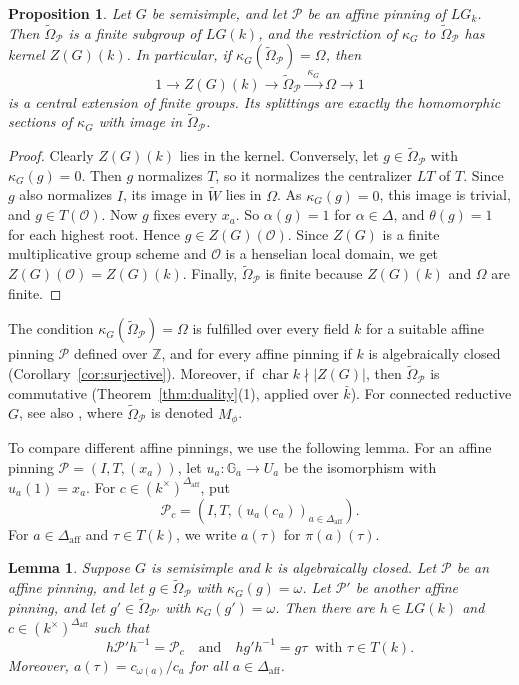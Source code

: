 \documentclass[psamsfonts]{amsart}
\newtheorem{prop}[thm]{Proposition}
\newtheorem{lem}[thm]{Lemma}
\theoremstyle{definition}
\theoremstyle{remark}
\numberwithin{equation}{section}
\newcommand{\Z}{\mathbb{Z}}   %
\newcommand{\extw}{\widetilde{W}}
\newcommand{\ra}{\rightarrow}
\newcommand{\xra}{\xrightarrow}
\newcommand{\tOm}{\widetilde{\Omega}}
\DeclareMathOperator{\aff}{aff}
\DeclareMathOperator{\chara}{char}
\newcommand\cO{\mathcal{O}}
\newcommand\cP{\mathcal{P}}
\newcommand\Ga{\mathbb{G}_a}
\numberwithin{equation}{section}
\newcommand{\om}{\omega}
\newcommand{\Om}{\Omega}
\newcommand{\Daff}{\Delta_{\aff}}
\theoremstyle{plain}
\begin{document}
\begin{prop}\label{prop:Z-extension}
Let $G$ be semisimple, and let $\cP$ be an affine pinning of $LG_k$. Then $\tOm_\cP$ is a finite subgroup of $LG(k)$, and the restriction of $\kappa_G$ to $\tOm_\cP$ has kernel $Z(G)(k)$. In particular, if $\kappa_G(\tOm_\cP)=\Om$, then
\[
1\ra Z(G)(k)\ra\tOm_\cP\xra{\ \kappa_G\ }\Om\ra1
\]
is a central extension of finite groups. Its splittings are exactly the homomorphic sections of $\kappa_G$ with image in $\tOm_\cP$.
\end{prop}

\begin{proof}
Clearly $Z(G)(k)$ lies in the kernel. Conversely, let $g\in\tOm_{\cP}$ with $\kappa_G(g)=0$. Then $g$ normalizes $T$, so it normalizes the centralizer $LT$ of $T$. Since $g$ also normalizes $I$, its image in $\extw$ lies in $\Om$. As $\kappa_G(g)=0$, this image is trivial, and $g\in T(\cO)$. Now $g$ fixes every $x_a$. So $\alpha(g)=1$ for $\alpha\in\Delta$, and $\theta(g)=1$ for each highest root. Hence $g\in Z(G)(\cO)$. Since $Z(G)$ is a finite multiplicative group scheme and $\cO$ is a henselian local domain, we get $Z(G)(\cO)=Z(G)(k)$. Finally, $\tOm_\cP$ is finite because $Z(G)(k)$ and $\Om$ are finite.
\end{proof}

The condition $\kappa_G(\tOm_\cP)=\Om$ is fulfilled over every field $k$ for a suitable affine pinning $\cP$ defined over $\Z$, and for every affine pinning if $k$ is algebraically closed (Corollary~\ref{cor:surjective}). Moreover, if $\chara k\nmid|Z(G)|$, then $\tOm_\cP$ is commutative (Theorem~\ref{thm:duality}(1), applied over $\bar k$). For connected reductive $G$, see also \cite[Proposition~3.14]{DLYZ}, where $\tOm_\cP$ is denoted $M_\phi$.

To compare different affine pinnings, we use the following lemma. For an affine pinning $\cP=(I,T,(x_a))$, let $u_a\colon\Ga\ra U_a$ be the isomorphism with $u_a(1)=x_a$. For $c\in(k^\times)^{\Daff}$, put
\[
\cP_c=(I,T,(u_a(c_a))_{a\in\Daff}).
\]
For $a\in\Daff$ and $\tau\in T(k)$, we write $a(\tau)$ for $\pi(a)(\tau)$.

\begin{lem}\label{lem:conj-pinning}
Suppose $G$ is semisimple and $k$ is algebraically closed. Let $\cP$ be an affine pinning, and let $g\in\tOm_{\cP}$ with $\kappa_G(g)=\om$. Let $\cP'$ be another affine pinning, and let $g'\in\tOm_{\cP'}$ with $\kappa_G(g')=\om$. Then there are $h\in LG(k)$ and $c\in(k^\times)^{\Daff}$ such that
\[
h\cP'h^{-1}=\cP_c\quad\text{and}\quad hg'h^{-1}=g\tau\ \text{ with }\tau\in T(k).
\]
Moreover, $a(\tau)=c_{\om(a)}/c_a$ for all $a\in\Daff$.
\end{lem}
\end{document}
